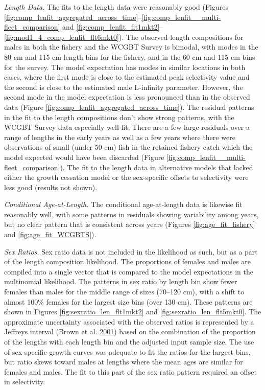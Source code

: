 \documentclass[12pt,]{article}
\begin{document}
\emph{Length Data.} The fits to the length data were reasonably good
(Figures
\ref{fig:comp_lenfit_aggregated_across_time}--\ref{fig:comp_lenfit__multi-fleet_comparison}
and
\ref{fig:comp_lenfit_flt1mkt2}--\ref{fig:mod1_4_comp_lenfit_flt6mkt0}).
The observed length compositions for males in both the fishery and the
WCGBT Survey is bimodal, with modes in the 80 cm and 115 cm length bins
for the fishery, and in the 60 cm and 115 cm bins for the survey. The
model expectation has modes in similar locations in both cases, where
the first mode is close to the estimated peak selectivity value and the
second is close to the estimated male L-infinity parameter. However, the
second mode in the model expectation is less pronounced than in the
observed data (Figure \ref{fig:comp_lenfit_aggregated_across_time}). The
residual patterns in the fit to the length compositions don't show
strong patterns, with the WCGBT Survey data especially well fit. There
are a few large residuals over a range of lengths in the early years as
well as a few years where there were observations of small (under 50 cm)
fish in the retained fishery catch which the model expected would have
been discarded (Figure \ref{fig:comp_lenfit__multi-fleet_comparison}).
The fit to the length data in alternative models that lacked either the
growth cessation model or the sex-specific offsets to selectivity were
less good (results not shown).

\emph{Conditional Age-at-Length.} The conditional age-at-length data is
likewise fit reasonably well, with some patterns in residuals showing
variability among years, but no clear pattern that is consistent across
years (Figures \ref{fig:age_fit_fishery} and \ref{fig:age_fit_WCGBTS}).

\emph{Sex Ratios.} Sex ratio data is not included in the likelihood as
such, but as a part of the length composition likelihood. The
proportions of females and males are compiled into a single vector that
is compared to the model expectations in the multinomial likelihood. The
patterns in sex ratio by length bin show fewer females than males for
the middle range of sizes (70--120 cm), with a shift to almost 100\%
females for the largest size bins (over 130 cm). These patterns are
shown in Figures \ref{fig:sexratio_len_flt1mkt2} and
\ref{fig:sexratio_len_flt5mkt0}. The approximate uncertainty associated
with the observed ratios is represented by a Jeffreys interval (Brown et
al. \protect\hyperlink{ref-brown2001interval}{2001}) based on the
combination of the proportion of the lengths with each length bin and
the adjusted input sample size. The use of sex-specific growth curves
was adequate to fit the ratios for the largest bins, but ratio skews
toward males at lengths where the mean ages are similar for females and
males. The fit to this part of the sex ratio pattern required an offset
in selectivity.
\end{document}

